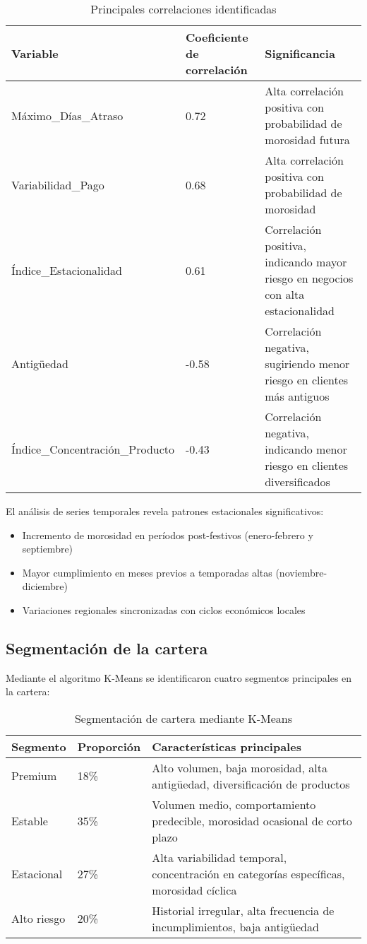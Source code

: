 \begin{table}[ht]
\centering
\begin{tabular}{|p{5cm}|p{3cm}|p{6cm}|}
\hline
\textbf{Variable} & \textbf{Coeficiente de correlación} & \textbf{Significancia} \\
\hline
Máximo\_Días\_Atraso & 0.72 & Alta correlación positiva con probabilidad de morosidad futura \\
\hline
Variabilidad\_Pago & 0.68 & Alta correlación positiva con probabilidad de morosidad \\
\hline
Índice\_Estacionalidad & 0.61 & Correlación positiva, indicando mayor riesgo en negocios con alta estacionalidad \\
\hline
Antigüedad & -0.58 & Correlación negativa, sugiriendo menor riesgo en clientes más antiguos \\
\hline
Índice\_Concentración\_Producto & -0.43 & Correlación negativa, indicando menor riesgo en clientes diversificados \\
\hline
\end{tabular}
\caption{Principales correlaciones identificadas}
\end{table}

El análisis de series temporales revela patrones estacionales significativos:

\begin{itemize}
    \item Incremento de morosidad en períodos post-festivos (enero-febrero y septiembre)
    \item Mayor cumplimiento en meses previos a temporadas altas (noviembre-diciembre)
    \item Variaciones regionales sincronizadas con ciclos económicos locales
\end{itemize}

\subsection{Segmentación de la cartera}
Mediante el algoritmo K-Means se identificaron cuatro segmentos principales en la cartera:

\begin{table}[ht]
\centering
\begin{tabular}{|p{2.5cm}|p{2.5cm}|p{9cm}|}
\hline
\textbf{Segmento} & \textbf{Proporción} & \textbf{Características principales} \\
\hline
Premium & 18\% & Alto volumen, baja morosidad, alta antigüedad, diversificación de productos \\
\hline
Estable & 35\% & Volumen medio, comportamiento predecible, morosidad ocasional de corto plazo \\
\hline
Estacional & 27\% & Alta variabilidad temporal, concentración en categorías específicas, morosidad cíclica \\
\hline
Alto riesgo & 20\% & Historial irregular, alta frecuencia de incumplimientos, baja antigüedad \\
\hline
\end{tabular}
\caption{Segmentación de cartera mediante K-Means}
\end{table}

